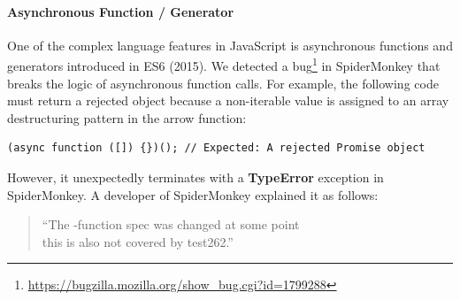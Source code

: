 
\paragraph{\textbf{Asynchronous Function / Generator}}
One of the complex language features in JavaScript is asynchronous functions and
generators introduced in ES6 (2015).
%
We detected a bug\footnote{
  \url{https://bugzilla.mozilla.org/show_bug.cgi?id=1799288}
} in SpiderMonkey that breaks the logic of asynchronous function calls.
%
For example, the following code must return a rejected  object
because a non-iterable value  is assigned to an array
destructuring pattern \jscode{[]} in the  arrow function:
%
\begin{lstlisting}[style=JS, basicstyle=\footnotesize\ttfamily]
    (async function ([]) {})(); // Expected: A rejected Promise object
\end{lstlisting}
However, it unexpectedly terminates with a \textbf{TypeError} exception in SpiderMonkey.
A developer of SpiderMonkey explained it as follows:
\begin{quote}
``The -function spec was changed at some point \textelp{}\\
this is also not covered by test262.''
\end{quote}
%


